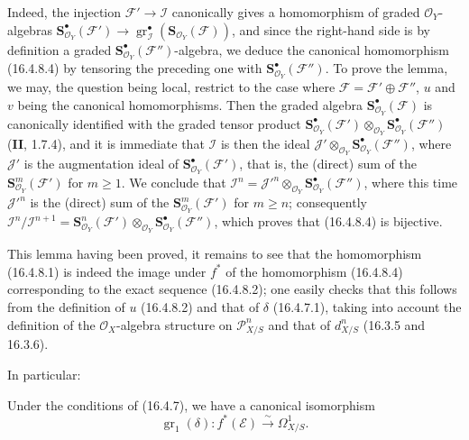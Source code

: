 Indeed, the injection $\mathscr{F}'\to\mathscr{I}$ canonically gives a
homomorphism of graded $\mathcal{O}_Y$-algebras\linebreak
$\mathbf{S}_{\mathcal{O}_Y}^{\bullet}(\mathscr{F}')\to\allowbreak
\operatorname{gr}_{\mathscr{I}}^\bullet
(\mathbf{S}_{\mathcal{O}_Y}(\mathscr{F}))$, and since the right-hand side is by
definition a graded $\mathbf{S}_{\mathcal{O}_Y}^{\bullet}(\mathscr{F}'')$-algebra,
we deduce the canonical homomorphism (16.4.8.4) by tensoring the preceding one
with $\mathbf{S}_{\mathcal{O}_Y}^{\bullet}(\mathscr{F}'')$. To
prove the lemma, we may, the question being local, restrict to the case where
$\mathscr{F}=\mathscr{F}'\oplus\mathscr{F}''$, $u$ and $v$ being the
canonical homomorphisms. Then the graded algebra
$\mathbf{S}_{\mathcal{O}_Y}^{\bullet}(\mathscr{F})$ is canonically identified
with the graded tensor product
$\mathbf{S}_{\mathcal{O}_Y}^{\bullet}(\mathscr{F}')
\otimes_{\mathcal{O}_Y}
\mathbf{S}_{\mathcal{O}_Y}^{\bullet}(\mathscr{F}'')$ (\textbf{II}, 1.7.4), and it is
immediate that $\mathscr{I}$ is then the ideal
$\mathscr{J}'\otimes_{\mathcal{O}_Y}
\mathbf{S}_{\mathcal{O}_Y}^{\bullet}(\mathscr{F}'')$, where $\mathscr{J}'$ is
the augmentation ideal of
$\mathbf{S}_{\mathcal{O}_Y}^{\bullet}(\mathscr{F}')$, that is, the
(direct) sum of the $\mathbf{S}_{\mathcal{O}_Y}^m(\mathscr{F}')$ for $m\geq1$.
We conclude that $\mathscr{I}^n=\mathscr{J}'^n\otimes_{\mathcal{O}_Y}
\mathbf{S}_{\mathcal{O}_Y}^{\bullet}(\mathscr{F}'')$, where this time
$\mathscr{J}'^n$ is the (direct) sum of the
$\mathbf{S}_{\mathcal{O}_Y}^m(\mathscr{F}')$ for $m\geq n$; consequently
$\mathscr{I}^n/\mathscr{I}^{n+1}=
\mathbf{S}_{\mathcal{O}_Y}^n(\mathscr{F}')\otimes_{\mathcal{O}_Y}
\mathbf{S}_{\mathcal{O}_Y}^{\bullet}(\mathscr{F}'')$, which proves that
(16.4.8.4) is bijective.

This lemma having been proved, it remains to see that the homomorphism
(16.4.8.1) is indeed the image under $f^*$ of the homomorphism (16.4.8.4)
corresponding to the exact sequence (16.4.8.2); one easily checks that this
follows from the definition of $u$ (16.4.8.2) and that of $\delta$ (16.4.7.1),
taking into account the definition of the $\mathcal{O}_X$-algebra structure on
$\mathscr{P}_{X/S}^n$ and that of $d_{X/S}^n$ (16.3.5 and 16.3.6).

In particular:

\begin{corollary}[16.4.9]
\label{IV.16.4.9}
Under the conditions of \textup{(16.4.7)}, we have a canonical isomorphism
\[
  \operatorname{gr}_1(\delta):f^*(\mathscr{E})
  \xrightarrow{\sim}\varOmega_{X/S}^1.
  \tag{16.4.9.1}
  \label{IV.16.4.9.1}
\]
\end{corollary}

